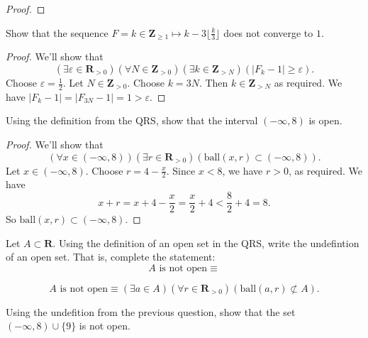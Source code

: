 \documentclass[12pt, fleqn, answers]{exam}
\newcommand{\reals}{\mathbf{R}}
\newcommand{\integers}{\mathbf{Z}}
\newcommand{\ball}{\mathrm{ball}}
\begin{document}
\begin{questions}
\begin{solution}
\begin{proof}
\end{proof}
\end{solution}
\question Show that the sequence $F = k \in \integers_{\geq 1} \mapsto k - 3 \lfloor \frac{k}{3} \rfloor $ does 
not converge to $1$.

\begin{solution}
\begin{proof}  We'll show that
\begin{equation*}
  \left(\exists \varepsilon \in \reals_{> 0} \right)
  \left(\forall  N \in \integers_{> 0} \right)
   \left(\exists  k \in \integers_{> N} \right)
   \left(  | F_k - 1 | \geq \varepsilon \right).
\end{equation*}
Choose $\varepsilon = \frac{1}{2}$. Let $N \in \integers_{>0}$. Choose $k = 3 N$. Then $k  \in \integers_{> N}$
as required. We have $|F_k - 1| = |F_{3 N} -1 | = 1 > \varepsilon$.
\end{proof}
\end{solution}

\question Using the definition from the QRS, show that the interval $(-\infty, 8)$ is open.

\begin{solution}
\begin{proof} We'll show that 
\begin{equation*}
   \left(\forall x \in (-\infty, 8)\right) \left(\exists r \in \reals_{>0}\right)(\ball(x,r)  \subset (-\infty, 8)).
\end{equation*}
Let $x \in   (-\infty, 8)$. Choose $r = 4 - \frac{x}{2}$. Since $x < 8$, we have $r > 0$, as required.  
We have 
\begin{equation*}
x + r = x + 4  - \frac{x}{2} = \frac{x}{2} + 4 < \frac{8}{2} + 4 = 8.
\end{equation*}
So $\ball(x,r)  \subset (-\infty, 8)$.
\end{proof}
\end{solution}

\question Let $A \subset \reals$.  Using the definition of an open set in the QRS, write
the undefintion of an open set. That is, complete the statement:
\begin{equation*}
  A \text{ is not open} \equiv 
\end{equation*}

\begin{solution}
\begin{equation*}
  A \text{ is not open} \equiv \left(\exists a \in A\right) \left(\forall r \in \reals_{>0}\right) \left(\ball(a,r) \not \subset A \right).
 \end{equation*}
\end{solution}
\question Using the undefition from the previous question, show that the set \mbox{$(-\infty, 8) \cup \{9 \}$} is
not open.


\end{questions}
\end{document}

